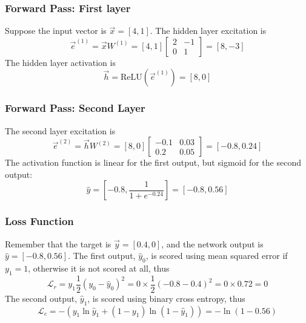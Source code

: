 \documentclass{beamer}
\begin{document}
\begin{frame}
  \frametitle{Forward Pass: First layer}

  Suppose the input vector is
  $\vec{x}=[4,1]$.  The hidden layer excitation is
  \begin{displaymath}
  \vec{e}^{(1)} = \vec{x} W^{(1)}=[4,1]\left[\begin{array}{cc}2&-1\\0&1\end{array}\right]=[8,-3]
  \end{displaymath}
  The hidden layer activation is
  \begin{displaymath}
  \vec{h}=\mbox{ReLU}\left(\vec{e}^{(1)}\right)=[8,0]
  \end{displaymath}
\end{frame}

\begin{frame}
  \frametitle{Forward Pass: Second Layer}

  The second layer excitation is
  \begin{displaymath}
  \vec{e}^{(2)}=\vec{h}W^{(2)}=[8,0]\left[\begin{array}{cc}-0.1&0.03\\0.2&0.05\end{array}\right]
  = [-0.8, 0.24]
  \end{displaymath}
  The activation function is linear for the first output, but sigmoid
  for the second output:
  \begin{displaymath}
  \hat{y}=\left[-0.8, \frac{1}{1+e^{-0.24}}\right] =
  \left[-0.8, 0.56 \right]
  \end{displaymath}
\end{frame}

\begin{frame}
  \frametitle{Loss Function}

  Remember that the target is $\vec{y}=[0.4,0]$, and the network
  output is $\hat{y}=\left[-0.8, 0.56 \right]$.  The first output,
  $\hat{y}_0$, is scored using mean squared error if $y_1=1$,
  otherwise it is not scored at all, thus
  \begin{displaymath}
    {\mathcal L}_r = y_1\frac{1}{2}\left(y_0-\hat{y}_0\right)^2 =
    0\times \frac{1}{2}\left(-0.8-0.4\right)^2 =0\times 0.72 = 0
  \end{displaymath}
  The second output, $\hat{y}_1$, is scored using binary cross
  entropy, thus
  \begin{displaymath}
    {\mathcal L}_c = -\left(y_1\ln\hat{y}_1+(1-y_1)\ln(1-\hat{y}_1)\right)
    = -\ln(1-0.56)
  \end{displaymath}
\end{frame}
\end{document}
